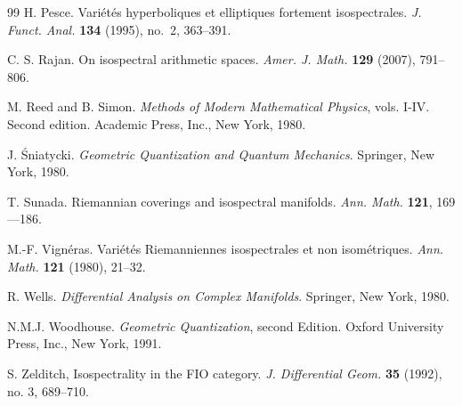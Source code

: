 \documentclass[12pt,leqno]{amsart}%
\theoremstyle{definition}
\theoremstyle{remark}
\numberwithin{equation}{section}
\begin{document}
\begin{thebibliography}{99}
 H. Pesce. Vari\'et\'es hyperboliques et
elliptiques fortement isospectrales.
\textit{J. Funct. Anal.} \textbf{134} (1995), no.~2, 363--391.

 C. S. Rajan.  On isospectral arithmetic spaces.  \textit{Amer. J.
Math.} \textbf{129} (2007), 791--806.

 M. Reed and B. Simon.  \textit{Methods of Modern Mathematical Physics}, vols. I-IV.  Second edition. Academic Press, Inc., New York, 1980.

 J. \'Sniatycki. \textit{Geometric Quantization and Quantum Mechanics}.  Springer, New York, 1980.

 T. Sunada. Riemannian coverings and isospectral manifolds.
\textit{Ann. Math.} \textbf{121}, 169---186.

 M.-F. Vign\'eras.  Vari\'et\'es Riemanniennes isospectrales et non
isom\'etriques.  \textit{Ann. Math.} \textbf{121} (1980), 21--32.

 R. Wells.  \textit{Differential Analysis on Complex Manifolds}. Springer,
New York, 1980.

 N.M.J. Woodhouse.  \textit{Geometric Quantization}, second Edition. Oxford
University Press, Inc., New York, 1991.

 S. Zelditch,  Isospectrality in the FIO category. \textit{J.
Differential Geom.} \textbf{35} (1992), no. 3, 689--710.
\end{thebibliography}
\end{document}
